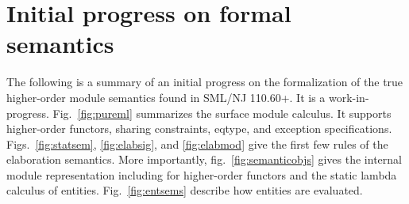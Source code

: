 \documentclass[12pt]{article}
\begin{document}

{

\appendix
\section{Initial progress on formal semantics}
The following is a summary of an initial progress on the formalization of the true higher-order module semantics found in SML/NJ 110.60+. It is a work-in-progress. Fig.~\ref{fig:pureml} summarizes the surface module calculus. It supports higher-order functors, sharing constraints, eqtype, and exception specifications. Figs.~\ref{fig:statsem}, \ref{fig:elabsig}, and \ref{fig:elabmod} give the first few rules of the elaboration semantics. More importantly, fig.~\ref{fig:semanticobjs} gives the internal module representation including for higher-order functors and the static lambda calculus of entities. Fig.~\ref{fig:entsems} describe how entities are evaluated.









% 
% 
}
\end{document}
